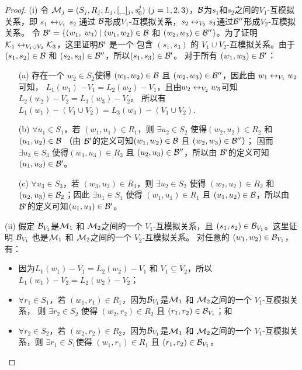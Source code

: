 \begin{proof}
	(i) 令 ${\cal M}_j=(S_j,R_j,L_j,[\_]_j,s_0^j)~(j=1,2,3)$，${\cal B}$为$s_1$和$s_2$之间的$V_1$-互模拟关系，即 $s_1$ $\leftrightarrow_{V_1}$ $s_2$ 通过 ${\cal B}$形成$V_1$-互模拟关系，$s_2 \leftrightarrow_{V_2} s_3$通过${\cal B}''$形成$V_2$-互模拟关系。 令 ${\cal B}' = \{(w_1,$ $w_3)\mid (w_1, w_2)\in {\cal B}$ 和 $(w_2, w_3)\in {\cal B}''\}$。为了证明 ${\cal K}_1\leftrightarrow_{V_1\cup V_2}{\cal K}_3$，这里证明${\cal B}'$ 是一个 包含 $(s_1, s_3)$ 的 $V_1 \cup V_2$-互模拟关系。由于$(s_1,s_2)\in {\cal B}$ 和 $(s_2, s_3)\in {\cal B}''$，所以$(s_1, s_3) \in {\cal B}'$。
	对于所有 $(w_1, w_3) \in {\cal B}'$：
	\begin{itemize}
		\item[(a)] 存在一个 $w_2 \in S_2$使得 $(w_1,w_2)\in {\cal B}$ 且 $(w_2, w_3)\in {\cal B}''$，因此由 $w_1 \leftrightarrow_{V_1} w_2$可知， $L_1(w_1)$ $-V_1 = L_2(w_2) - V_1$，且由$w_2 \leftrightarrow_{V_2} w_3$可知 $L_2(w_2) - V_2 = L_3(w_3) - V_2$。
		所以有 $L_1(w_1) - (V_1 \cup V_2) = L_3(w_3) - (V_1 \cup V_2)$.
		\item[(b)] $\forall u_1\in S_1$，若 $(w_1, u_1) \in R_1$，则 $\exists u_2\in S_2$ 使得$(w_2, u_2) \in R_2$ 和 $(u_1,u_2)\in {\cal B}$ （由 ${\cal B}'$的定义可知$(w_1,w_2)\in {\cal B}$ 且 $(w_2, w_3) \in {\cal B}''$）； 因而 $\exists u_3 \in S_3$ 使得$(w_3, u_3) \in R_3$ 且 $(u_2, u_3) \in {\cal B}''$，所以由 ${\cal B}'$的定义可知 $(u_1, u_3) \in {\cal B}'$。
		\item[(c)] $\forall u_3\in S_3$，若 $(w_3, u_3) \in R_3$，则 $\exists u_2\in S_2$ 使得 $(w_2, u_2) \in R_2$ 和 $(u_2, u_3) \in {\cal B}_2$；因此 $\exists u_1 \in S_1$ 使得  $(w_1, u_1) \in R_1$ 且 $(u_1, u_2) \in {\cal B}$，所以由 ${\cal B}'$的定义可知$(u_1, u_3) \in {\cal B}'$。
	\end{itemize}
	
	(ii) 假定 ${\cal B}_{V_1}$是${\cal M}_1$ 和 ${\cal M}_2$之间的一个 $V_1$-互模拟关系，且 $(s_1, s_2)\in {\cal B}_{V_1}$。这里证明 ${\cal B}_{V_1}$ 也是${\cal M}_1$ 和 ${\cal M}_2$之间的一个 $V_2$-互模拟关系。
	对任意的 $(w_1, w_2) \in {\cal B}_{V_1}$，有：
	\begin{itemize}
		\item 因为$L_1(w_1) - V_1 = L_2(w_2) -V_1$ 和 $V_1 \subseteq V_2$，所以 $L_1(w_1) - V_2 = L_2(w_2) -V_2$；
		\item $\forall r_1 \in S_1$，若 $(w_1,r_1) \in R_1$，因为${\cal B}_{V_1}$是${\cal M}_1$ 和 ${\cal M}_2$之间的一个 $V_1$-互模拟关系， 则 $\exists r_2\in S_2$ 使得 $(w_2,r_2)\in R_2$ 且 $(r_1,r_2) \in {\cal B}_{V_1}$；和
		\item $\forall r_2 \in S_2$，若 $(w_2,r_2) \in R_2$，因为${\cal B}_{V_1}$是${\cal M}_1$ 和 ${\cal M}_2$之间的一个 $V_1$-互模拟关系，则 $\exists r_1\in S_1$使得 $(w_1,r_1)\in R_1$ 且 $(r_1,r_2) \in {\cal B}_{V_1}$。
	\end{itemize}
	

\end{proof}
